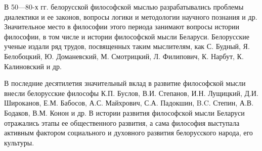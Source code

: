 В 50—80-х гг. белорусской философской мыслью разрабатывались проблемы диалектики и ее законов, вопросы логики и методологии научного познания и др. Значительное место в философии этого периода занимают вопросы истории философии, в том числе и истории философской мысли Беларуси. Белорусские ученые издали ряд трудов, посвященных таким мыслителям, как С. Будный, Я. Белобоцкий, Ю. Доманевский, М. Смотрицкий, Л. Филипович, К. Нарбут, К. Калиновский и др.

В последние десятилетия значительный вклад в развитие философской мысли внесли белорусские философы К.П. Буслов, В.И. Степанов, И.Н. Лущицкий, Д.И. Широканов, Е.М. Бабосов, А.С. Майхрович, С.А. Падокшин, B.C. Степин, А.В. Бодаков, В.М. Конон и др. В истории развития философской мысли Беларуси отражались этапы ее общественного развития, а сама философия выступала активным фактором социального и духовного развития белорусского народа, его культуры.

